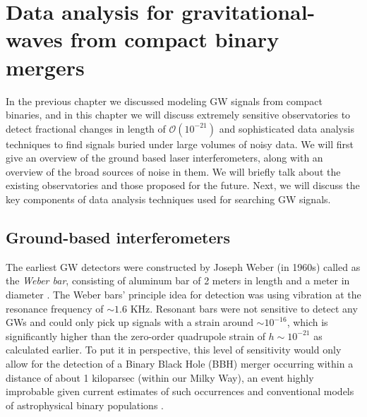\chapter{Data analysis for gravitational-waves from compact binary mergers}

In the previous chapter we discussed modeling GW signals from compact binaries, and in this chapter we will discuss  extremely sensitive observatories to detect fractional changes in length of $\mathcal{O}(10^{-21})$ and sophisticated data analysis techniques to find signals buried under large volumes of noisy data.  We will first give an overview of the ground based laser interferometers, along with an overview of the broad sources of noise in them. We will briefly talk about the existing observatories and those proposed for the future. Next, we will discuss the key components of data analysis techniques used for searching GW signals.    



\section{Ground-based interferometers}
The earliest GW detectors were constructed by Joseph Weber (in 1960s) called as the \textit{Weber bar}, consisting of aluminum bar of 2 meters in length and a meter in diameter \cite{Weber:1960zz}. The Weber bars' principle idea for detection was using vibration at the resonance frequency of $\sim 1.6$ KHz. Resonant bars were not sensitive to detect any GWs and could only pick up signals with a strain around $\sim 10^{-16}$, which is significantly higher than the zero-order quadrupole strain of $h \sim 10^{-21}$ as calculated earlier. To put it in perspective, this level of sensitivity would only allow for the detection of a Binary Black Hole (BBH) merger occurring within a distance of about 1 kiloparsec (within our Milky Way), an event highly improbable given current estimates of such occurrences and conventional models of astrophysical binary populations \cite{Nitz:2021zwj,LIGOScientific:2021djp,Olsen:2022pin, Belczynski:2001uc,vandenHeuvel:2017pwp, Marchant:2016wow, Fragione:2018vty, Rodriguez:2017pec,Sedda:2020wzl}.

